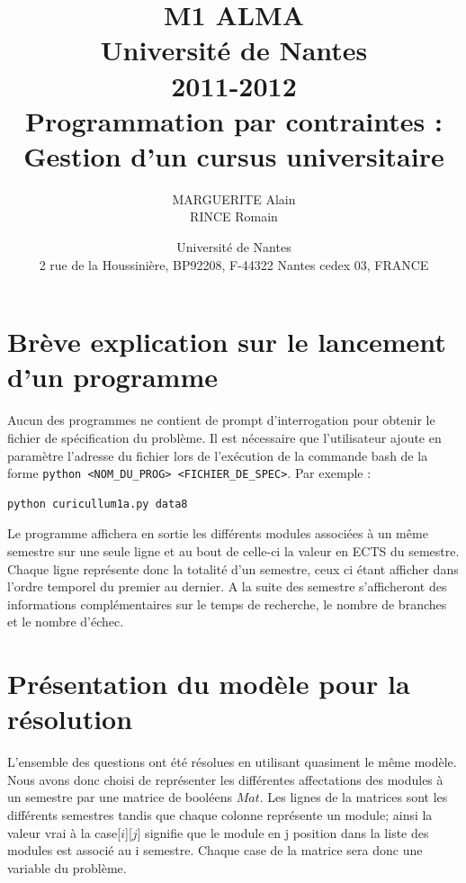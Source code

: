 \documentclass[a4paper, 11pt]{article}
\title
{
	\normalsize{ M1 ALMA\\ 
	Université de Nantes\\
	2011-2012}\\
	\vspace{15mm}
	\Huge{Programmation par contraintes :\\ Gestion d'un cursus universitaire}
}
\author{MARGUERITE Alain\\ RINCE Romain
	\vspace{45mm}
}
\date
{	
	\normalsize{Université de Nantes \\ 2 rue de la Houssinière, BP92208, F-44322 Nantes cedex 03, FRANCE
	}
}
\begin{document}
\maketitle

\clearpage
\tableofcontents
\clearpage


\section{Brève explication sur le lancement d'un programme}
Aucun des programmes ne contient de prompt d'interrogation pour obtenir le fichier de spécification du problème. Il est nécessaire que l'utilisateur ajoute en paramètre l'adresse du fichier lors de l’exécution de la commande bash de la forme \verb+python <NOM_DU_PROG> <FICHIER_DE_SPEC>+. Par exemple : \begin{verbatim}python curicullum1a.py data8\end{verbatim}

Le programme affichera en sortie les différents modules associées à un même semestre sur une seule ligne et au bout de celle-ci la valeur en ECTS du semestre. Chaque ligne représente donc la totalité d'un semestre, ceux ci étant afficher dans l'ordre temporel du premier au dernier.
A la suite des semestre s'afficheront des informations complémentaires sur le temps de recherche, le nombre de branches et le nombre d'échec.

\section{Présentation du modèle pour la résolution}
L'ensemble des questions ont été résolues en utilisant quasiment le même modèle. Nous avons donc choisi de représenter les différentes affectations des modules à un semestre par une matrice de booléens $Mat$.  Les lignes de la matrices sont les différents semestres tandis que chaque colonne représente un module; ainsi la valeur vrai à la case[$i$][$j$] signifie que le module en j position dans la liste des modules est associé au i semestre. Chaque case de la matrice sera donc une variable du problème.
\end{document}
